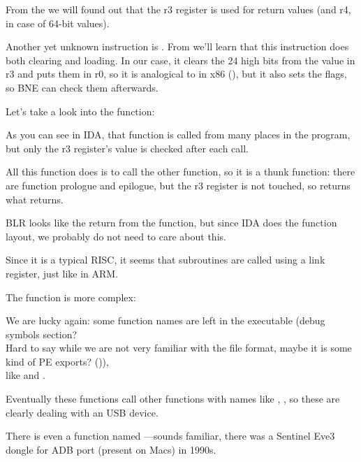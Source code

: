 From the \PPCABI we will found out that the r3 register is used for return values (and r4, in case of 64-bit values).

Another yet unknown instruction is . 
From \PPC we'll learn that this instruction does both clearing and loading. 
In our case, it clears the 24 high bits from the value in r3
and puts them in r0, so it is analogical to \MOVZX in x86 (),
but it also sets the flags, so \ac{BNE} 
can check them afterwards.

Let's take a look into the  function:



As you can see in \ac{IDA}, that function is called from many places in the program, but only the r3 register's value
is checked after each call.

All this function does is to call the other function, so it is a \gls{thunk function}: 
there are function prologue and epilogue, but the r3 register is not touched, so  
returns what  returns.

\ac{BLR} looks like the return from the function, but since \ac{IDA} does the function layout, we probably do not need
to care about this.

Since it is a typical \ac{RISC}, it seems that subroutines are called using a \gls{link register},
just like in ARM.

The  function is more complex:




We are lucky again: some function names are left in the executable 
(debug symbols section? \\
Hard to say while we are not very familiar with the file format, maybe it is
some kind of PE exports? ()),\\
like  and .

Eventually these functions call other functions with names like , 
,
so these are clearly dealing with an USB device.

There is even a function named 
---sounds familiar, there was a Sentinel Eve3 
dongle for ADB port (present on Macs) in 1990s.

